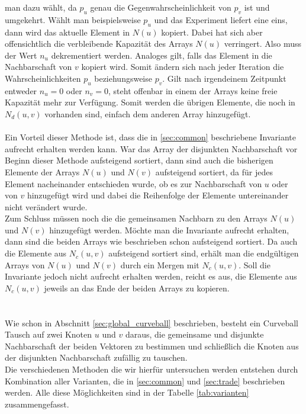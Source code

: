 man dazu wählt, da $p_u$ genau die Gegenwahrscheinlichkeit von $p_v$ ist und umgekehrt. 
Wählt man beispielsweise $p_u$ und das Experiment liefert eine eins, dann wird das aktuelle Element
in $N(u)$ kopiert. Dabei
hat sich aber offensichtlich die verbleibende Kapazität des Arrays $N(u)$ verringert. Also muss
der Wert $n_u$ dekrementiert werden. Analoges gilt, falls das Element in die Nachbarschaft von $v$ kopiert wird.
Somit ändern sich nach jeder Iteration die Wahrscheinlichkeiten $p_u$ beziehungsweise $p_v$.
Gilt nach irgendeinem Zeitpunkt entweder $n_u = 0$ oder $n_v = 0$, steht offenbar in einem der Arrays 
keine freie Kapazität mehr zur Verfügung. Somit werden die übrigen Elemente, die noch in $N_{d}(u,v)$ vorhanden sind, 
einfach dem anderen Array hinzugefügt.
\\
\\
Ein Vorteil dieser Methode ist, dass die in \ref{sec:common} beschriebene Invariante aufrecht erhalten werden kann.
War das Array der disjunkten Nachbarschaft vor Beginn dieser Methode aufsteigend sortiert,
dann sind auch die bisherigen Elemente der Arrays $N(u)$ und $N(v)$ aufsteigend sortiert, da für jedes
Element nacheinander entschieden wurde, ob es zur Nachbarschaft von $u$ oder von $v$ hinzugefügt wird und dabei die
Reihenfolge der Elemente untereinander nicht verändert wurde.
\\
Zum Schluss müssen noch die die gemeinsamen Nachbarn zu den Arrays $N(u)$ und $N(v)$ hinzugefügt werden.
Möchte man die Invariante aufrecht erhalten, dann sind die beiden Arrays wie beschrieben schon
aufsteigend sortiert. Da auch die Elemente aus $N_{c}(u,v)$ aufsteigend sortiert sind, erhält man
die endgültigen Arrays von $N(u)$ und $N(v)$ durch ein Mergen mit $N_{c}(u,v)$. Soll die Invariante jedoch
nicht aufrecht erhalten werden, reicht es aus, die Elemente aus $N_{c}(u,v)$ jeweils an das Ende der beiden Arrays
zu kopieren.




\section{\ct}
Wie schon in Abschnitt \ref{sec:global_curveball} beschrieben, 
besteht ein Curveball Tausch auf zwei Knoten $u$ und $v$ daraus, die 
gemeinsame und disjunkte Nachbarschaft der beiden Vektoren zu bestimmen
und schließlich die Knoten aus der disjunkten Nachbarschaft zufällig zu tauschen.
\\
Die verschiedenen Methoden die wir hierfür untersuchen werden 
entstehen durch Kombination aller Varianten, die in \ref{sec:common} und \ref{sec:trade} beschrieben 
werden. Alle diese Möglichkeiten sind in der Tabelle \ref{tab:varianten} zusammengefasst.


